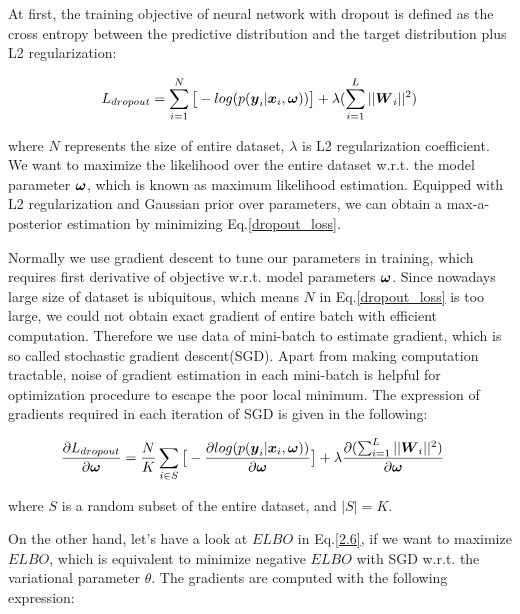 At first, the training objective of neural network with dropout is defined as the cross entropy between the predictive distribution and the target distribution plus L2 regularization:

\begin{equation}
\begin{aligned} \label{dropout_loss}
L_{dropout}   = \sum_{i=1}^{N}\big[-log(p(\boldsymbol y_{i}| \boldsymbol x_{i}, \boldsymbol \omega))\big] + \lambda(\sum_{i=1}^{L} ||\boldsymbol W_{i}||^{2})
\end{aligned}
\end{equation}

where $N$ represents the size of entire dataset, $\lambda$ is L2 regularization coefficient. We want to maximize the likelihood over the entire dataset w.r.t. the model parameter $\boldsymbol \omega$, which is known as maximum likelihood estimation. Equipped with L2 regularization and Gaussian prior over parameters, we can obtain a max-a-posterior estimation by minimizing Eq.\ref{dropout_loss}. 

Normally we use gradient descent to tune our parameters in training, which requires first derivative of objective w.r.t. model parameters $\boldsymbol \omega$. Since nowadays large size of dataset is ubiquitous, which means $N$ in Eq.\ref{dropout_loss} is too large, we could not obtain exact gradient of entire batch with efficient computation. Therefore we use data of mini-batch to estimate gradient, which is so called stochastic gradient descent(SGD). Apart from making computation tractable, noise of gradient estimation in each mini-batch is helpful for optimization procedure to escape the poor local minimum. The expression of gradients required in each iteration of SGD is given in the following:


\begin{equation}
\begin{aligned} \label{dropout_grad}
\frac{\partial L_{dropout}}{\partial \boldsymbol \omega} &=\frac{N}{K}\sum_{i \in S}\big[-\frac{\partial log(p(\boldsymbol y_{i}| \boldsymbol x_{i}, \boldsymbol \omega))}{\partial \boldsymbol \omega}\big] + \lambda\frac{\partial (\sum_{i=1}^{L} ||\boldsymbol W_{i}||^{2})}{\partial \boldsymbol \omega}
\end{aligned}
\end{equation}

where $S$ is a random subset of the entire dataset, and $|S| = K$.

On the other hand, let's have a look at $ELBO$ in Eq.\ref{2.6}, if we want to maximize $ELBO$, which is equivalent to minimize negative $ELBO$ with SGD w.r.t. the variational parameter $\theta$. The gradients are computed with the following expression:

